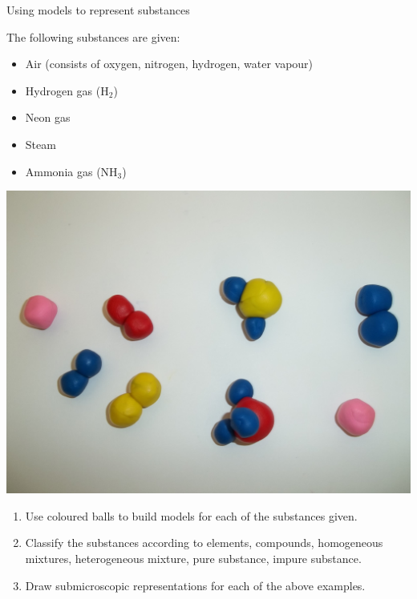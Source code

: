 \pagebreak
\begin{activity}{Using models to represent substances}{
\begin{minipage}{.5\textwidth}
The following substances are given:
\label{m38708*eip-id1166921187210}
\begin{itemize}[noitemsep]
    \item Air (consists of oxygen, nitrogen, hydrogen, water vapour)
    \item Hydrogen gas ($\text{H}_2$)
    \item Neon gas
    \item Steam
    \item Ammonia gas ($\text{NH}_3$)
\end{itemize}
\end{minipage}
\begin{minipage}{.5\textwidth}
\begin{center}
 \includegraphics[width=.7\textwidth]{photos/models_classification.jpg}\par
\end{center}
\end{minipage}
\noindent
\begin{enumerate}[noitemsep, label=\textbf{\arabic*}.]
\item Use coloured balls to build models for each of the substances given.
\item Classify the substances according to elements, compounds, homogeneous mixtures, heterogeneous mixture, pure substance, impure substance.
\item Draw submicroscopic representations for each of the above examples.
\end{enumerate}

}
\end{activity}

